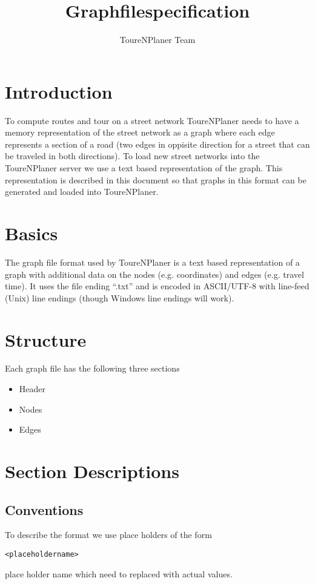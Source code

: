 \documentclass[ngerman,titlepage,parskip=true]{scrartcl}
\title{Graphfilespecification}
\author{ToureNPlaner Team}
\begin{document}
\maketitle

\tableofcontents

\section{Introduction}
To compute routes and tour on a street network ToureNPlaner needs to have a memory representation of the street network as 
a graph where each edge represents a section of a road (two edges in oppisite direction for a street that can be traveled in both directions).
To load new street networks into the ToureNPlaner server we use a text based representation of the graph.
This representation is described in this document so that graphs in this format can be generated and loaded into ToureNPlaner.

\section{Basics}
The graph file format used by ToureNPlaner is a text based representation of a graph with additional data on the nodes (e.g. coordinates)
and edges (e.g. travel time).
It uses the file ending ``.txt'' and is encoded in ASCII/UTF-8 with line-feed (Unix) line endings (though Windows line endings will work).

\section{Structure}
Each graph file has the following three sections
\begin{itemize}
 \item Header
 \item Nodes
 \item Edges
\end{itemize}

\section{Section Descriptions}
\subsection{Conventions}
To describe the format we use place holders of the form 
\begin{verbatim}
<placeholdername>                                                         
\end{verbatim}
place holder name which need to replaced with
actual values.
\end{document}
